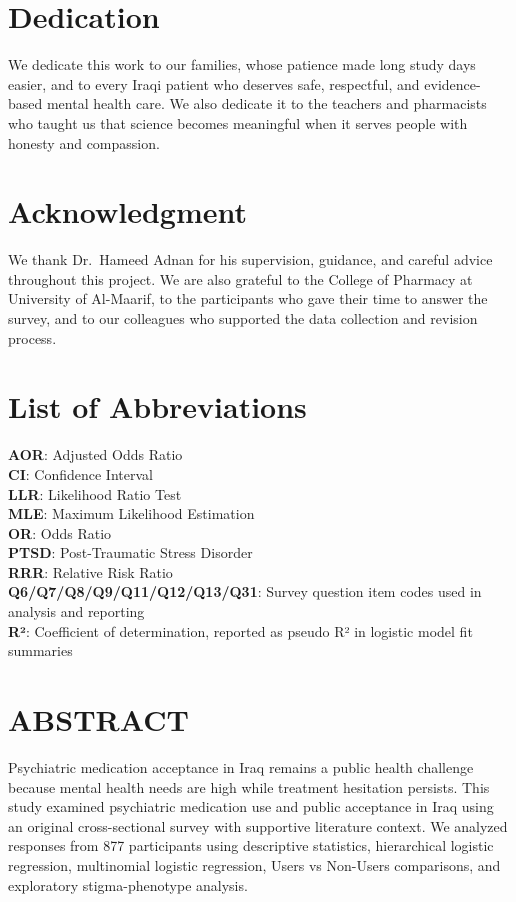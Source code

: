 \documentclass[12pt,a4paper]{article}
\begin{document}
\section*{Dedication}
We dedicate this work to our families, whose patience made long study days easier, and to every Iraqi patient who deserves safe, respectful, and evidence-based mental health care. We also dedicate it to the teachers and pharmacists who taught us that science becomes meaningful when it serves people with honesty and compassion.
\newpage
\section*{Acknowledgment}
We thank Dr.\ Hameed Adnan for his supervision, guidance, and careful advice throughout this project. We are also grateful to the College of Pharmacy at University of Al-Maarif, to the participants who gave their time to answer the survey, and to our colleagues who supported the data collection and revision process.
\newpage
\tableofcontents
\newpage
\listoffigures
\newpage
\section*{List of Abbreviations}
\textbf{AOR}: Adjusted Odds Ratio \\ 
\textbf{CI}: Confidence Interval \\ 
\textbf{LLR}: Likelihood Ratio Test \\ 
\textbf{MLE}: Maximum Likelihood Estimation \\ 
\textbf{OR}: Odds Ratio \\ 
\textbf{PTSD}: Post-Traumatic Stress Disorder \\ 
\textbf{RRR}: Relative Risk Ratio \\ 
\textbf{Q6/Q7/Q8/Q9/Q11/Q12/Q13/Q31}: Survey question item codes used in analysis and reporting \\ 
\textbf{R²}: Coefficient of determination, reported as pseudo R² in logistic model fit summaries
\newpage
{}
\setcounter{page}{1}
\section*{ABSTRACT}
Psychiatric medication acceptance in Iraq remains a public health challenge because mental health needs are high while treatment hesitation persists. This study examined psychiatric medication use and public acceptance in Iraq using an original cross-sectional survey with supportive literature context. We analyzed responses from 877 participants using descriptive statistics, hierarchical logistic regression, multinomial logistic regression, Users vs Non-Users comparisons, and exploratory stigma-phenotype analysis.
\end{document}
